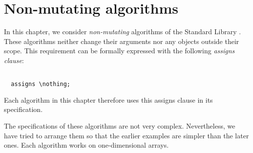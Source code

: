 
\chapter{Non-mutating algorithms}

In this chapter, we consider \emph{non-mutating} algorithms
of the \cxx Standard Library \cite[\S 28.5]{cxx-17-draft}.
These algorithms neither change their arguments nor any objects outside their scope.
This requirement can be formally expressed with the following 
\emph{assigns clause}:
\begin{lstlisting}[style=acsl-block]

  assigns \nothing;
\end{lstlisting}

Each algorithm in this chapter therefore uses this assigns clause
in its specification.

The specifications of these algorithms are not very complex.
Nevertheless, we have tried to arrange them so that the earlier
examples are simpler than the later ones. 
Each algorithm works on one-dimensional arrays.

